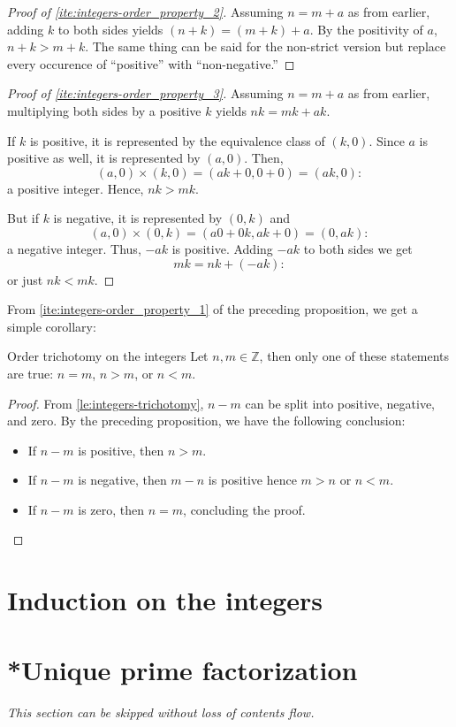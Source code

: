 \begin{proof}[Proof of \cref{ite:integers-order_property_2}]
  Assuming \(n = m + a\) as from earlier, adding \(k\) to both sides yields
  \((n + k) = (m + k) + a\). By the positivity of \(a\), \(n + k > m + k\). The same thing can be
  said for the non-strict version but replace every occurence of \enquote{positive} with
  \enquote{non-negative.}
\end{proof}

\begin{proof}[Proof of \cref{ite:integers-order_property_3}]
  Assuming \(n = m + a\) as from earlier, multiplying both sides by a positive \(k\) yields
  \(nk = mk + ak\).

  If \(k\) is positive, it is represented by the equivalence class of \((k, 0)\). Since \(a\) is
  positive as well, it is represented by \((a, 0)\). Then,
  \begin{equation}
    (a, 0) \times (k, 0) = (ak + 0, 0 + 0) = (ak, 0):
  \end{equation}
  a positive integer. Hence, \(nk > mk\).

  But if \(k\) is negative, it is represented by \((0, k)\) and
  \begin{equation}
    (a, 0) \times (0, k) = (a0 + 0k, ak + 0) = (0, ak):
  \end{equation}
  a negative integer. Thus, \(-ak\) is positive. Adding \(-ak\) to both sides we get
  \begin{equation}
    mk = nk + (-ak):
  \end{equation}
  or just \(nk < mk\).
\end{proof}

From \cref{ite:integers-order_property_1} of the preceding proposition, we get a simple corollary:

\begin{cor}{Order trichotomy on the integers}{}
  Let \(n, m \in \mathbb{Z}\), then only one of these statements are true: \(n = m\), \(n > m\), or
  \(n < m\).
\end{cor}

\begin{proof}
  From \cref{le:integers-trichotomy}, \(n - m\) can be split into positive, negative,
  and zero. By the preceding proposition, we have the following conclusion:
  \begin{itemize}
    \item If \(n - m\) is positive, then \(n > m\).
    \item If \(n - m\) is negative, then \(m - n\) is positive hence \(m > n\) or \(n < m\).
    \item If \(n - m\) is zero, then \(n = m\), concluding the proof.
  \end{itemize}
\end{proof}

\section{Induction on the integers}

\section{*Unique prime factorization}

\emph{This section can be skipped without loss of contents flow.}
